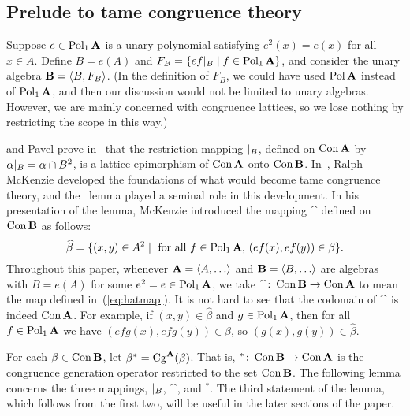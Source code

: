 \subsection{Prelude to tame congruence theory}
\label{sec:residuation-lemma}
Suppose $e \in \operatorname{Pol}_1\mathbf{A}$ is a unary polynomial satisfying $e^2(x) = e(x)$ for
all $x\in A$.  Define $B=e(A)$ and
$F_B = \{ef|_B \mid f\in \operatorname{Pol}_1\mathbf{A}\}$, and consider the
unary algebra $\mathbf{B}= \langle B, F_B\rangle$.
(In the definition of  $F_B$, we could have used
$\operatorname{Pol} \mathbf{A}$ instead of $\operatorname{Pol}_1\mathbf{A}$, and then our discussion would not be
limited to unary algebras.  However, we are mainly concerned with
congruence lattices, so we lose nothing by restricting the scope in this way.)

\Peter \Palfy and Pavel \Pudlak
prove in~\cite[Lemma~1]{Palfy:1980} that
the restriction mapping $|_B$, defined on $\operatorname{Con}\mathbf{A}$ by
$\alpha|_B = \alpha \cap B^2$, is a lattice epimorphism of $\operatorname{Con}\mathbf{A}$ onto $\operatorname{Con}\mathbf{B}$.
In~\cite{McKenzie:1983}, Ralph McKenzie
developed the foundations of what would become tame congruence theory, and
the \PP\ lemma played a seminal role in this development.  In his presentation
of the lemma, McKenzie introduced the mapping $\hatmap$ defined on $\operatorname{Con}\mathbf{B}$ as follows:
\begin{equation}
  \label{eq:hatmap}
\widehat{\beta} = \{(x,y) \in A^2 \mid \text{ for all }
f\in \operatorname{Pol}_1\mathbf{A}, \, (ef(x), ef(y))\in \beta \}.
\end{equation}
Throughout this paper, whenever $\bA = \< A, \dots\>$
 and $\bB = \< B, \dots\>$ are algebras with $B = e(A)$ for some
$e^2 = e \in \operatorname{Pol}_1\mathbf{A}$,  we take 
$\hatmap \colon \Con\bB \rightarrow \Con\bA$ to mean the map 
defined in~(\ref{eq:hatmap}).
It is not hard to see that the codomain of $\hatmap$ is indeed $\operatorname{Con}\mathbf{A}$.  For
example, if $(x,y) \in \widehat{\beta}$ and $g\in \operatorname{Pol}_1\mathbf{A}$, then for all 
$f\in \operatorname{Pol}_1\mathbf{A}$ we have $(efg(x),efg(y)) \in \beta$, so 
$(g(x),g(y))\in \widehat{\beta}$.

For each $\beta \in \operatorname{Con}\mathbf{B}$, let $\beta^* = \operatorname{Cg}^{\mathbf{A}}(\beta)$.  That is,
$^*\colon \operatorname{Con}\mathbf{B} \rightarrow \operatorname{Con}\mathbf{A}$ is
the congruence generation operator restricted to the set $\operatorname{Con}\mathbf{B}$.
The following lemma concerns the three mappings, $|_B$, $\hatmap$, and $^*$.
The third statement of the lemma, which follows from the first two,
will be useful in the later sections of the paper.

